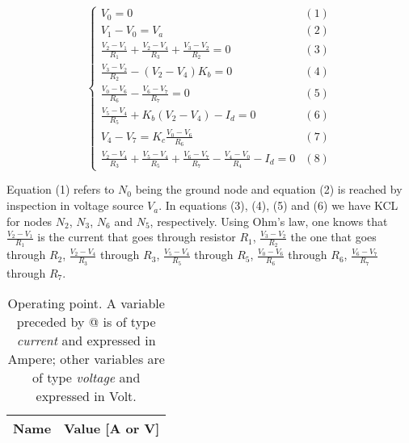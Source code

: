 \begin{equation}
\begin{cases}
V_0 = 0 & \mbox{$(1)$} \\
V_1-V_0 = V_a & \mbox{$(2)$}  \\
\frac{V_2-V_1}{R_1} + \frac{V_2-V_4}{R_3} + \frac{V_3-V_2}{R_2} = 0 & \mbox{$(3)$} \\
\frac{V_3-V_2}{R_2} - (V_2-V_4) K_b = 0 & \mbox{$(4)$} \\
\frac{V_0-V_6}{R_6} - \frac{V_6-V_7}{R_7} = 0 & \mbox{$(5)$}\\
\frac{V_5-V_4}{R_5} + K_b (V_2 - V_4) - I_d = 0 & \mbox{$(6)$}\\
V_4-V_7 = K_c \frac{V_0-V_6}{R_6} & \mbox{$(7)$} \\
\frac{V_2-V_4}{R_3} + \frac{V_5-V_4}{R_5} +  \frac{V_6-V_7}{R_7} - \frac{V_4-V_0}{R_4} - I_d = 0 & \mbox{$(8)$}
\end{cases}
\end{equation}

\par
Equation (1) refers to $N_0$ being the ground node and equation (2) is reached by inspection in voltage source $V_a$. In equations (3), (4), (5) and (6) we have KCL for nodes $N_2$, $N_3$, $N_6$ and $N_5$, respectively.  Using Ohm's law, one knows that $\frac{V_2 - V_1}{R_1}$ is the current that goes through resistor $R_1$, $\frac{V_3-V_2}{R_2}$ the one that goes through $R_2$, $\frac{V_2-V_4}{R_3}$ through $R_3$, $\frac{V_5-V_4}{R_5}$ through $R_5$, $\frac{V_0-V_6}{R_6}$ through $R_6$, $\frac{V_6-V_7}{R_7}$ through $R_7$.

\begin{table}[h]
  \centering
  \begin{tabular}{|c|c|}
    \hline    
    {\bf Name} & {\bf Value [A or V]} \\ \hline
    
  \end{tabular}
  \caption{Operating point. A variable preceded by @ is of type {\em current}
    and expressed in Ampere; other variables are of type {\it voltage} and expressed in
    Volt.}
  \label{tab:op}
\end{table}

